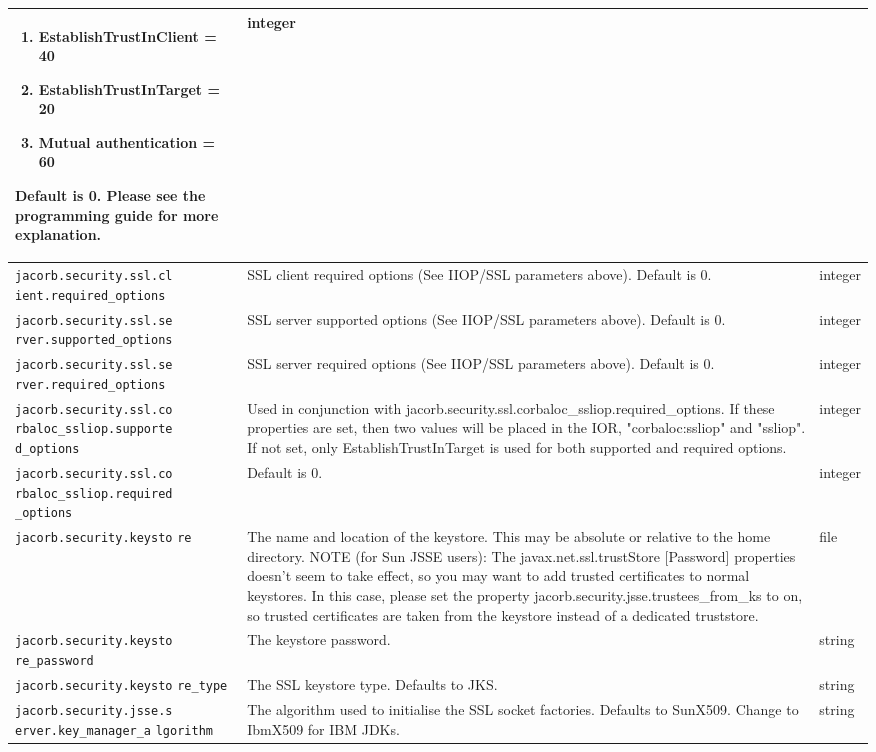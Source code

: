 {{\begin{small}
\begin{longtable}{|p{5cm}|p{9cm}|p{2cm}|}
\begin{enumerate}
\item EstablishTrustInClient = 40
\item EstablishTrustInTarget = 20
\item Mutual authentication = 60
\end{enumerate}
Default is 0. Please see the programming guide for more explanation. & integer \\
\hline
\verb"jacorb.security.ssl.cl"
\verb"ient.required_options" & SSL client required options (See IIOP/SSL parameters above). Default is 0. & integer \\
\hline
\verb"jacorb.security.ssl.se"
\verb"rver.supported_options" & SSL server supported options (See IIOP/SSL parameters above). Default is 0. & integer \\
\hline
\verb"jacorb.security.ssl.se"
\verb"rver.required_options" & SSL server required options (See IIOP/SSL parameters above). Default is 0. & integer \\
\hline
\verb"jacorb.security.ssl.co"
\verb"rbaloc_ssliop.supporte"
\verb"d_options" & Used in conjunction with jacorb.security.ssl.corbaloc\_ssliop.required\_options. If these properties are set, then two values will be placed in the IOR, "corbaloc:ssliop" and "ssliop". If not set, only EstablishTrustInTarget is used for both supported and required options. & integer \\
\hline
\verb"jacorb.security.ssl.co"
\verb"rbaloc_ssliop.required"
\verb"_options" &  Default is 0. & integer \\
\hline
\verb"jacorb.security.keysto"
\verb"re" & The name and location of the keystore. This may be absolute or relative to the home directory. NOTE (for Sun JSSE users): The javax.net.ssl.trustStore [Password] properties doesn't seem to take effect, so you may want to add trusted certificates to normal keystores. In this case, please set the property jacorb.security.jsse.trustees\_from\_ks to on, so trusted certificates are taken from the keystore instead of a dedicated truststore.  & file \\
\hline
\verb"jacorb.security.keysto"
\verb"re_password" & The keystore password. & string \\
\hline
\verb"jacorb.security.keysto"
\verb"re_type" & The SSL keystore type. Defaults to JKS. & string \\
\hline
\verb"jacorb.security.jsse.s"
\verb"erver.key_manager_a"
\verb"lgorithm" & The algorithm used to initialise the SSL socket factories. Defaults to SunX509. Change to IbmX509 for IBM JDKs. & string \\

\end{longtable}
\end{small}}}
